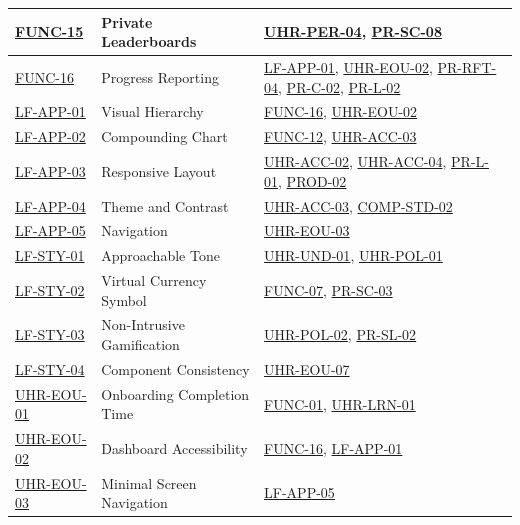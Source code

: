 \documentclass[12pt]{article}
\begin{document}
\begin{xltabular}{\textwidth}{|p{2.3cm}|p{4.2cm}|X|}
\hline
\hyperlink{req:FUNC-15}{FUNC-15} & Private Leaderboards & \hyperlink{req:UHR-PER-04}{UHR-PER-04}, \hyperlink{req:PR-SC-08}{PR-SC-08} \\
\hline
\hyperlink{req:FUNC-16}{FUNC-16} & Progress Reporting & \hyperlink{req:LF-APP-01}{LF-APP-01}, \hyperlink{req:UHR-EOU-02}{UHR-EOU-02}, \hyperlink{req:PR-RFT-04}{PR-RFT-04}, \hyperlink{req:PR-C-02}{PR-C-02}, \hyperlink{req:PR-L-02}{PR-L-02} \\
\hline
\hyperlink{req:LF-APP-01}{LF-APP-01} & Visual Hierarchy & \hyperlink{req:FUNC-16}{FUNC-16}, \hyperlink{req:UHR-EOU-02}{UHR-EOU-02} \\
\hline
\hyperlink{req:LF-APP-02}{LF-APP-02} & Compounding Chart & \hyperlink{req:FUNC-12}{FUNC-12}, \hyperlink{req:UHR-ACC-03}{UHR-ACC-03} \\
\hline
\hyperlink{req:LF-APP-03}{LF-APP-03} & Responsive Layout & \hyperlink{req:UHR-ACC-02}{UHR-ACC-02}, \hyperlink{req:UHR-ACC-04}{UHR-ACC-04}, \hyperlink{req:PR-L-01}{PR-L-01}, \hyperlink{req:PROD-02}{PROD-02} \\
\hline
\hyperlink{req:LF-APP-04}{LF-APP-04} & Theme and Contrast & \hyperlink{req:UHR-ACC-03}{UHR-ACC-03}, \hyperlink{req:COMP-STD-02}{COMP-STD-02} \\
\hline
\hyperlink{req:LF-APP-05}{LF-APP-05} & Navigation & \hyperlink{req:UHR-EOU-03}{UHR-EOU-03} \\
\hline
\hyperlink{req:LF-STY-01}{LF-STY-01} & Approachable Tone & \hyperlink{req:UHR-UND-01}{UHR-UND-01}, \hyperlink{req:UHR-POL-01}{UHR-POL-01} \\
\hline
\hyperlink{req:LF-STY-02}{LF-STY-02} & Virtual Currency Symbol & \hyperlink{req:FUNC-07}{FUNC-07}, \hyperlink{req:PR-SC-03}{PR-SC-03} \\
\hline
\hyperlink{req:LF-STY-03}{LF-STY-03} & Non-Intrusive Gamification & \hyperlink{req:UHR-POL-02}{UHR-POL-02}, \hyperlink{req:PR-SL-02}{PR-SL-02} \\
\hline
\hyperlink{req:LF-STY-04}{LF-STY-04} & Component Consistency & \hyperlink{req:UHR-EOU-07}{UHR-EOU-07} \\
\hline
\hyperlink{req:UHR-EOU-01}{UHR-EOU-01} & Onboarding Completion Time & \hyperlink{req:FUNC-01}{FUNC-01}, \hyperlink{req:UHR-LRN-01}{UHR-LRN-01} \\
\hline
\hyperlink{req:UHR-EOU-02}{UHR-EOU-02} & Dashboard Accessibility & \hyperlink{req:FUNC-16}{FUNC-16}, \hyperlink{req:LF-APP-01}{LF-APP-01} \\
\hline
\hyperlink{req:UHR-EOU-03}{UHR-EOU-03} & Minimal Screen Navigation & \hyperlink{req:LF-APP-05}{LF-APP-05} \\

\end{xltabular}
\end{document}
